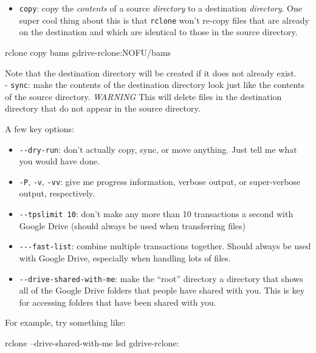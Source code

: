 \documentclass[]{krantz}
\makeatletter
\newenvironment{Shaded}{\begin{snugshade}}{\end{snugshade}}
\newcommand{\ExtensionTok}[1]{#1}
\newcommand{\NormalTok}[1]{#1}
\providecommand{\tightlist}{%
  \setlength{\itemsep}{0pt}\setlength{\parskip}{0pt}}
\newenvironment{kframe}{%
\medskip{}
\setlength{\fboxsep}{.8em}
 \def\at@end@of@kframe{}%
 \ifinner\ifhmode%
  \def\at@end@of@kframe{\end{minipage}}%
  \begin{minipage}{\columnwidth}%
 \fi\fi%
 \def\FrameCommand##1{\hskip\@totalleftmargin \hskip-\fboxsep
 \colorbox{shadecolor}{##1}\hskip-\fboxsep
     \hskip-\linewidth \hskip-\@totalleftmargin \hskip\columnwidth}%
 \MakeFramed {\advance\hsize-\width
   \@totalleftmargin\z@ \linewidth\hsize
   \@setminipage}}%
 {\par\unskip\endMakeFramed%
 \at@end@of@kframe}
\renewenvironment{Shaded}{\begin{kframe}}{\end{kframe}}
\makeatother
\begin{document}
\begin{itemize}
\tightlist
\item
  \texttt{copy}: copy the \emph{contents} of a source \emph{directory} to a destination \emph{directory}. One super cool
  thing about this is that \texttt{rclone} won't re-copy files that are already on the destination and which
  are identical to those in the source directory.
\end{itemize}

\begin{Shaded}
\begin{Highlighting}[]
\ExtensionTok{rclone}\NormalTok{ copy bams gdrive-rclone:NOFU/bams}
\end{Highlighting}
\end{Shaded}

Note that the destination directory will be created if it does not already exist.\\
- \texttt{sync}: make the contents of the destination directory look just like the
contents of the source directory. \emph{WARNING} This will delete files in the destination
directory that do not appear in the source directory.

A few key options:

\begin{itemize}
\tightlist
\item
  \texttt{-\/-dry-run}: don't actually copy, sync, or move anything. Just tell me what you would have done.
\item
  \texttt{-P}, \texttt{-v}, \texttt{-vv}: give me progress information, verbose output, or super-verbose output, respectively.
\item
  \texttt{-\/-tpslimit\ 10}: don't make any more than 10 transactions a second with Google Drive (should always be used when transferring files)
\item
  \texttt{-\/-\/-fast-list}: combine multiple transactions together. Should always be used with Google Drive,
  especially when handling lots of files.
\item
  \texttt{-\/-drive-shared-with-me}: make the ``root'' directory a directory that shows all
  of the Google Drive folders that people have shared with you. This is key for accessing
  folders that have been shared with you.
\end{itemize}

For example, try something like:

\begin{Shaded}
\begin{Highlighting}[]
\ExtensionTok{rclone}\NormalTok{ --drive-shared-with-me lsd gdrive-rclone:}
\end{Highlighting}
\end{Shaded}
\end{document}
